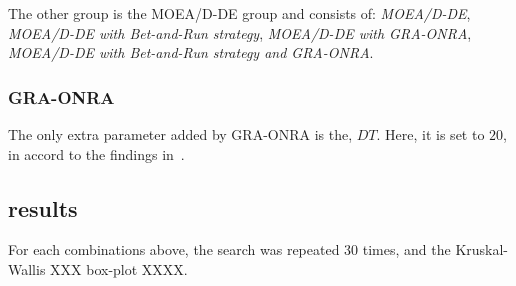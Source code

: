 The other group is the MOEA/D-DE group and consists of: \textit{MOEA/D-DE}, \textit{MOEA/D-DE with Bet-and-Run strategy}, \textit{MOEA/D-DE with GRA-ONRA}, \textit{MOEA/D-DE with Bet-and-Run strategy and GRA-ONRA}.

\subsubsection{GRA-ONRA}
The only extra parameter added by GRA-ONRA is the, $DT$. Here, it is set to $20$, in accord to the findings in~\cite{zhou2016all}. 


\subsection{results}

For each combinations above, the search was repeated 30 times, and the Kruskal-Wallis XXX box-plot XXXX.
%
%
%
%
%
%
%
%
%
%
%
%
%
%
